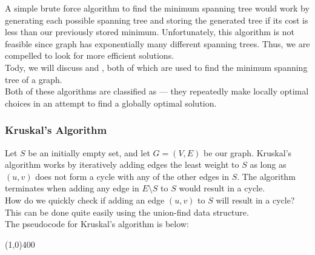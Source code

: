 A simple brute force algorithm to find the minimum spanning tree would work by generating each possible spanning tree and storing the generated tree if its cost is less than our previously stored minimum. Unfortunately, this algorithm is not feasible since graph has exponentially many different spanning trees. Thus, we are compelled to look for more efficient solutions.  \\

Tody, we will discuss  and , both of which are used to find the minimum spanning tree of a graph.  \\

Both of these algorithms are classified as  --- they repeatedly make locally optimal choices in an attempt to find a globally optimal solution.


\subsubsection{Kruskal's Algorithm}

Let $S$ be an initially empty set, and let $G = (V, E)$ be our graph. Kruskal's algorithm works by iteratively adding edges the least weight to $S$ as long as $(u, v)$ does not form a cycle with any of the other edges in $S$. The algorithm terminates when adding any edge in $E \setminus S$ to $S$ would result in a cycle. \\

How do we quickly check if adding an edge $(u, v)$ to $S$ will result in a cycle? This can be done quite easily using the union-find data structure. \\

The pseudocode for Kruskal's algorithm is below:


\vspace{1em}
\begin{center}
\line(1,0){400}
\end{center}

